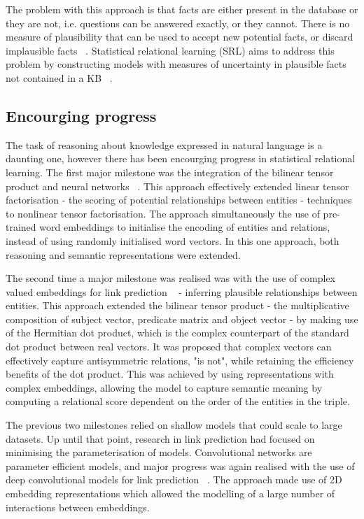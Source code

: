 \noindent The problem with this approach is that facts are either present in the database or they are not, i.e. questions can be answered exactly, or they cannot. There is no measure of plausibility that can be used to accept new potential facts, or discard implausible facts \unskip~\citep{koller2007introduction}. Statistical relational learning (SRL) aims to address this problem by constructing models with measures of uncertainty in plausible facts not contained in a KB \unskip~\citep{koller2007introduction}.\par

\subsection{Encourging progress} 

The task of reasoning about knowledge expressed in natural language is a daunting one, however there has been encourging progress in statistical relational learning. The first major milestone was the integration of the bilinear tensor product and neural networks \unskip~\citep{socher2013reasoning}. This approach effectively extended linear tensor factorisation - the scoring of potential relationships between entities - techniques to nonlinear tensor factorisation. The approach simultaneously the use of pre-trained word embeddings to initialise the encoding of entities and relations, instead of using randomly initialised word vectors. In this one approach, both reasoning and semantic representations were extended. \par

\noindent The second time a major milestone was realised was with the use of complex valued embeddings for link prediction \unskip~\citep{trouillon2016complex} - inferring plausible relationships between entities. This approach extended the bilinear tensor product - the multiplicative composition of subject vector, predicate matrix and object vector - by making use of the Hermitian dot product, which is the complex counterpart of the standard dot product between real vectors. It was proposed that complex vectors can effectively capture antisymmetric relations, "is not", while retaining the efficiency benefits of the dot product. This was achieved by using representations with complex embeddings, allowing the model to capture semantic meaning by computing a relational score dependent on the order of the entities in the triple. \par
 
\noindent The previous two milestones relied on shallow models that could scale to large datasets. Up until that point, research in link prediction had focused on minimising the parameterisation of models. Convolutional networks are parameter efficient models, and major progress was again realised with the use of deep convolutional models for link prediction \unskip~\citep{dettmers2018convolutional}. The approach made use of 2D embedding representations which allowed the modelling of a large number of interactions between embeddings. \par

